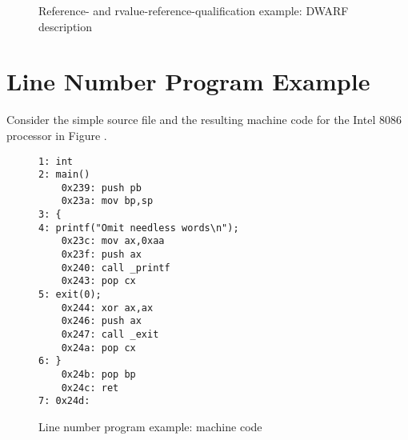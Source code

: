 \begin{figure}[h]
\caption{Reference- and rvalue-reference-qualification example: DWARF \mbox{description}}
\label{fig:memberfunctionrefqualexampledwarfdescription}
\end{figure}


\clearpage
\section{Line Number Program Example}
\label{app:linenumberprogramexample}

Consider the simple source file and the resulting machine
code for the Intel 8086 processor in 
Figure .

\begin{figure}[here]
\begin{lstlisting}
1: int
2: main()
    0x239: push pb
    0x23a: mov bp,sp
3: {
4: printf("Omit needless words\n");
    0x23c: mov ax,0xaa
    0x23f: push ax
    0x240: call _printf
    0x243: pop cx
5: exit(0);
    0x244: xor ax,ax
    0x246: push ax
    0x247: call _exit
    0x24a: pop cx
6: }
    0x24b: pop bp
    0x24c: ret
7: 0x24d:
\end{lstlisting}
\caption{Line number program example: machine code}
\label{fig:linenumberprogramexamplemachinecode}
\end{figure}

